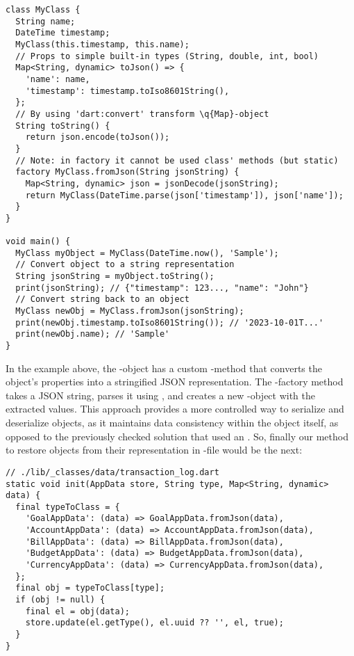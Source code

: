 \begin{lstlisting}
class MyClass {
  String name;
  DateTime timestamp;
  MyClass(this.timestamp, this.name);
  // Props to simple built-in types (String, double, int, bool)
  Map<String, dynamic> toJson() => {
    'name': name,
    'timestamp': timestamp.toIso8601String(),
  };
  // By using 'dart:convert' transform \q{Map}-object
  String toString() {
    return json.encode(toJson());
  }
  // Note: in factory it cannot be used class' methods (but static)
  factory MyClass.fromJson(String jsonString) {
    Map<String, dynamic> json = jsonDecode(jsonString);
    return MyClass(DateTime.parse(json['timestamp']), json['name']);
  }
}

void main() {
  MyClass myObject = MyClass(DateTime.now(), 'Sample');
  // Convert object to a string representation
  String jsonString = myObject.toString();
  print(jsonString); // {"timestamp": 123..., "name": "John"}
  // Convert string back to an object
  MyClass newObj = MyClass.fromJson(jsonString);
  print(newObj.timestamp.toIso8601String()); // '2023-10-01T...'
  print(newObj.name); // 'Sample'
}
\end{lstlisting}

\noindent In the example above, the -object has a custom -method that converts the object's 
properties into a stringified JSON representation. The -factory method takes a JSON string, parses it using 
, and creates a new -object with the extracted values. This approach provides a more 
controlled way to serialize and deserialize objects, as it maintains data consistency within the object itself,
as opposed to the previously checked solution that used an . So, finally our method to restore objects 
from their representation in -file would be the next:

\begin{lstlisting}[firstnumber=54]
// ./lib/_classes/data/transaction_log.dart
static void init(AppData store, String type, Map<String, dynamic> data) {
  final typeToClass = {
    'GoalAppData': (data) => GoalAppData.fromJson(data),
    'AccountAppData': (data) => AccountAppData.fromJson(data),
    'BillAppData': (data) => BillAppData.fromJson(data),
    'BudgetAppData': (data) => BudgetAppData.fromJson(data),
    'CurrencyAppData': (data) => CurrencyAppData.fromJson(data),
  };
  final obj = typeToClass[type];
  if (obj != null) {
    final el = obj(data);
    store.update(el.getType(), el.uuid ?? '', el, true);
  }
}
\end{lstlisting}


